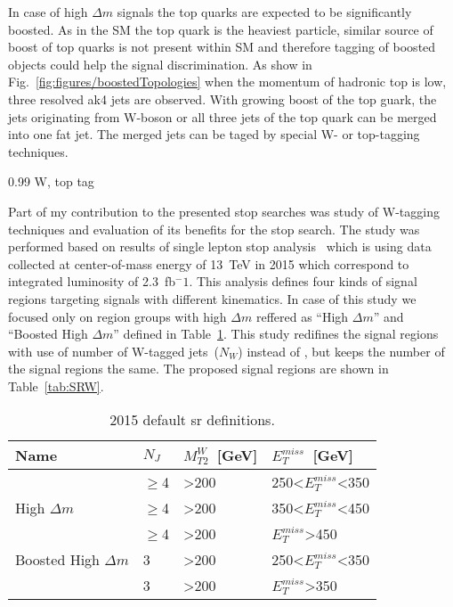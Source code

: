 In case of high  $\Delta m$ signals the top quarks are expected to be significantly boosted. As in the SM the top quark is the heaviest particle, similar source of boost of top quarks is not present within SM and therefore tagging of boosted objects could help the signal discrimination. As show in Fig.~\ref{fig:figures/boostedTopologies} when the momentum of hadronic top is low, three resolved ak4 jets are observed. With growing boost of the top guark, the jets originating from W-boson or all three jets of the top quark can be merged into one fat jet. The merged jets can be taged by special W- or top-tagging techniques.

                 {0.99}       %
                 { W, top tag }


Part of my contribution to the presented stop searches was study of W-tagging techniques and evaluation of its benefits for the stop search. The study was performed based on results of single lepton stop analysis~\cite{Sirunyan:2016jpr} which is using data collected at center-of-mass energy of 13~TeV in 2015 which correspond to integrated luminosity of 2.3~fb$^-1$. This analysis defines four kinds of signal regions targeting signals with different kinematics. In case of this study we focused only on region groups with high $\Delta m $ reffered as ``High $\Delta m$'' and ``Boosted High $\Delta m$'' defined in Table~\ref{tab:SRnoW}. This study redifines the signal regions with use of number of W-tagged jets~($N_{W}$) instead of \MET, but keeps the number of the signal regions the same. The proposed signal regions are shown in Table~\ref{tab:SRW}.

\begin{table}[h]
\begin{center}
\begin{tabular}{|l|l|l|l|}
\hline
Name            & $N_{J}$  & $M_{T2}^{W}$~[GeV] & $E_{T}^{miss}$~[GeV]  \\
\hline
\hline
                & $\geq$4  & >200                & 250<$E_{T}^{miss}$<350   \\
High $\Delta m$ & $\geq$4  & >200                & 350<$E_{T}^{miss}$<450   \\
                & $\geq$4  & >200                & $E_{T}^{miss}$>450   \\
\hline
Boosted High $\Delta m$ & 3  & >200                & 250<$E_{T}^{miss}$<350   \\
                        & 3  & >200                & $E_{T}^{miss}$>350   \\
\hline
\end{tabular}
\caption[Table caption text]{2015 default sr definitions. }
\label{tab:SRnoW}
\end{center}
\end{table}

